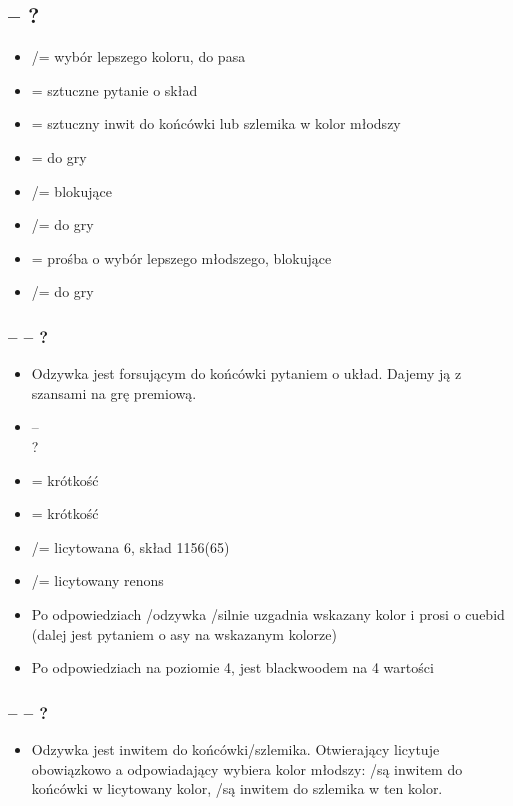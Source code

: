 \documentclass[12pt]{article}
\begin{document}
\subsection{\texorpdfstring{\NT[2] – ?}{2NT – ?}}
\begin{itemize}
    \item \Cs[3]/\Ds[] = wybór lepszego koloru, do pasa
    \item \Hs[3] = sztuczne pytanie o skład
    \item \Ss[3] = sztuczny inwit do końcówki lub szlemika w kolor młodszy
    \item \NT[3] = do gry
    \item \Cs[4]/\Ds[] = blokujące
    \item \Hs[4]/\Ss[] = do gry
    \item \NT[4] = prośba o wybór lepszego młodszego, blokujące
    \item \Cs[5]/\Ds[5] = do gry
\end{itemize}
\subsubsection{\texorpdfstring{\NT[2] – \Hs[3] – ?}{2NT – 3H - ?}}
\begin{itemize}
    \item Odzywka \Hs[3] jest forsującym do końcówki pytaniem o układ. Dajemy ją z szansami na grę premiową.
    \item \NT[2] – \Hs[3]
  \\ ?
  \item \Ss[3] = krótkość \Ss[]
  \item \NT[3] = krótkość \Hs[]
  \item \Cs[4]/\Ds[] = licytowana 6, skład 1156(65)
  \item \Hs[4]/\Ss[] = licytowany renons
  \item Po odpowiedziach \Ss[3]/\NT[] odzywka \Cs[4]/\Ds[] silnie uzgadnia wskazany kolor i prosi o cuebid (dalej \NT[4] jest pytaniem o asy na wskazanym kolorze)
  \item Po odpowiedziach na poziomie 4, \NT[4] jest blackwoodem na 4 wartości
  \end{itemize}
\subsubsection{\texorpdfstring{\NT[2] – \Ss[3] – ?}{2NT – 3S - ?}}
\begin{itemize}
    \item Odzywka \Ss[3] jest inwitem do końcówki/szlemika. Otwierający licytuje obowiązkowo \NT[3] a odpowiadający wybiera kolor młodszy: \Cs[4]/\Ds[] są inwitem do końcówki w licytowany kolor, \Cs[5]/\Ds[] są inwitem do szlemika w ten kolor.
\end{itemize}
\end{document}
